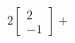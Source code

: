 \documentclass[preview]{standalone}
\begin{document}
\begin{align*}
2\begin{bmatrix} 2 \\ -1 \end{bmatrix} +
\end{align*}
\end{document}
